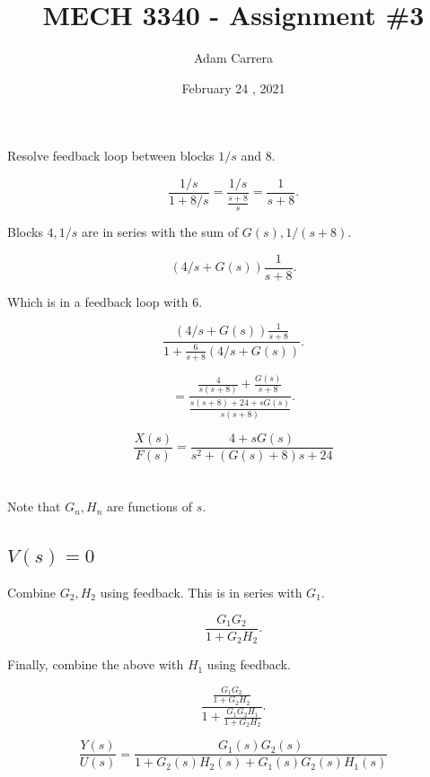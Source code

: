 \documentclass[12pt]{article}
\author{Adam Carrera}
\date{February 24 , 2021}
\title{MECH 3340 - Assignment \#3}
\numberwithin{equation}{section}
\newcommand\ddfrac[2]{\frac{\displaystyle #1}{\displaystyle #2}}
\begin{document}
  \maketitle

  \section{}

  Resolve feedback loop between blocks $ 1/s $ and $ 8. $

  \[
      \frac{1/s}{1+8/s} = \ddfrac{1/s}{\frac{s+8}{s}} = \frac{1}{s+8}
    .\]

  Blocks $ 4, 1/s $ are in series with the sum of $ G(s), 1/(s+8). $

  \[
      (4/s + G(s))\frac{1}{s+8}
    .\]

  Which is in a feedback loop with $ 6. $

  \[
      \ddfrac{(4/s + G(s))\frac{1}{s+8}}{1 + \frac{6}{s+8} \left( 4/s + G(s) \right) }
    .\]

  \[
      = \ddfrac{\frac{4}{s(s+8)} + \frac{G(s)}{s + 8}}{\frac{s(s+8) + 24 + sG(s)}{s(s + 8)}}
    .\]

  \begin{equation}
    \frac{X(s)}{F(s)} = \frac{4 + sG(s)}{s ^2 + (G(s) + 8)s + 24}
  \end{equation}

  \newpage



  \section{}

  Note that $ G_n, H_n $ are functions of $ s. $

  \subsection{$ V(s) = 0 $}

  Combine $ G_2, H_2 $ using feedback. This is in series with $ G_1. $

  \[
      \frac{G_1 G_2}{1 + G_2H_2}
    .\]

  Finally, combine the above with $ H_1 $ using feedback.

  \[
      \ddfrac{\frac{G_1 G_2}{1 + G_2H_2}}{1 + \frac{G_1G_2H_1}{1 + G_2H_2}}
    .\]

  \begin{equation}
    \frac{Y(s)}{U(s)} = \frac{G_1(s)G_2(s)}{1 + G_2(s)H_2(s) + G_1(s)G_2(s)H_1(s)}
  \end{equation}
\end{document}
